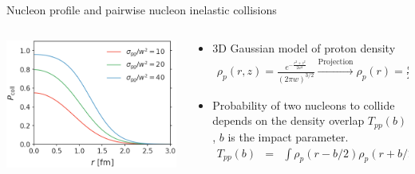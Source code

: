 \documentclass[11pt, aspectratio=169]{beamer}
\begin{document}
\begin{frame}{Nucleon profile and pairwise nucleon inelastic collisions}
\begin{columns}
\begin{column}[c]{.35\textwidth}
\begin{center}
\vspace{-1em}
\includegraphics[width=\textwidth]{Pcoll.png}
\end{center}
\end{column}
\begin{column}[c]{.65\textwidth}
\begin{itemize}
\item 3D Gaussian model of proton density
\vspace{-.5em}
\begin{eqnarray}
\nonumber
\rho_p(r, z) = \frac{e^{-\frac{r^2+z^2}{2w^2}}}{(2\pi w)^{3/2}} 
 \xrightarrow{\textrm{Projection}} \rho_p(r) = \frac{e^{-\frac{r^2}{2w^2}}}{2\pi w^2} 
\end{eqnarray}
\item Probability of two nucleons to collide depends on the density overlap $T_{pp}(b)$, $b$ is the impact parameter.
\vspace{-.5em}
\begin{eqnarray}
\nonumber
T_{pp}(b) &=& \int \rho_p(r-b/2) \rho_p(r+b/2) dr^2 

\end{eqnarray}
\end{itemize}
\end{column}
\end{columns}
\end{frame}
\end{document}
